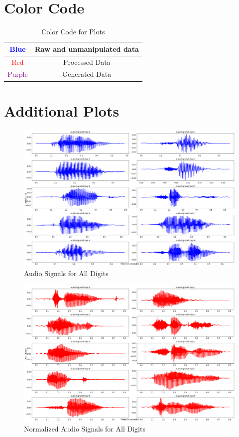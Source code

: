 \documentclass[12pt]{article}
\begin{document}
\section{Color Code}
\begin{table}[h]
    \centering
    \caption{Color Code for Plots}
    \label{tab:my_label}
    \begin{tabular}{|c|c|}
        \hline
        \rowcolor{blue!20} \textcolor{blue}{Blue} & Raw and unmanipulated data \\
        \hline
        \rowcolor{red!20} \textcolor{red}{Red} & Processed Data \\
        \hline
        \rowcolor{purple!20} \textcolor{purple}{Purple} & Generated Data \\
        \hline
    \end{tabular}
\end{table}


\section{Additional Plots}
\begin{figure}[h!]
    \centering
    \includegraphics[width=0.9\linewidth]{figures/raw_all.png}
    \caption{Audio Signals for All Digits}
    \label{fig:enter-label}
\end{figure}


\begin{figure}[h!]
    \centering
    \includegraphics[width=0.9\linewidth]{figures/raw_normal.png}
    \caption{Normalized Audio Signals for All Digits}
    \label{fig:enter-label}
\end{figure}
\end{document}
